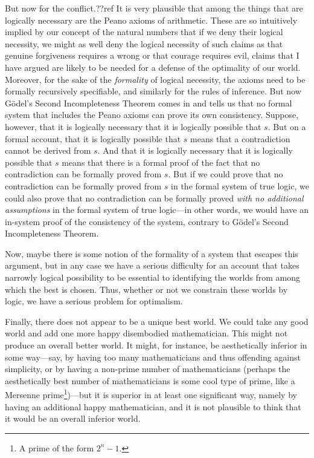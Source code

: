 But now for the conflict.??ref It is very plausible that among the things that are logically necessary are the Peano axioms of 
arithmetic. These are so intuitively implied by our concept of the natural numbers that if we deny their logical necessity,
we might as well deny the logical necessity of such claims as that genuine forgiveness requires a wrong or that courage 
requires evil, claims that I have argued are likely to be needed for a defense of the optimality of our world. Moreover, for
the sake of the \textit{formality} of logical necessity, the axioms need to be formally recursively specifiable, and similarly
for the rules of inference. But now G\"odel's Second Incompleteness Theorem comes in and tells us that no formal system 
that includes the Peano axioms can prove its own consistency. Suppose, however, that it is logically necessary that it is 
logically possible that $s$. But on a formal account, that it is logically possible that $s$ means that a contradiction
cannot be derived from $s$. And that it is logically necessary that it is logically possible that $s$ means that there is 
a formal proof of the fact that no contradiction can be formally proved from $s$. But if we could prove that no 
contradiction can be formally proved from $s$ in the formal system of true logic, we could also prove that no 
contradiction can be formally proved \textit{with no additional assumptions} in the formal system of true logic---in other words,
we would have an in-system proof of the consistency of the system, contrary to G\"odel's Second Incompleteness Theorem.

Now, maybe there is some notion of the formality of a system that escapes this argument, but in any case we have a 
serious difficulty for an account that takes narrowly logical possibility to be essential to identifying the worlds 
from among which the best is chosen. Thus, whether or not we constrain these worlds by logic, we have a serious problem
for optimalism.

Finally, there does not appear to be a unique best world. We could take any good world and add one more happy disembodied mathematician.
This might not produce an overall better world. It might, for instance, be aesthetically inferior in some way---say, by having too many
mathematicians and thus offending against simplicity, or by having a non-prime number of mathematicians (perhaps the aesthetically best 
number of mathematicians is some cool type of prime, like a Mersenne prime\footnote{A prime of the form $2^n-1$.})---but it is superior in at least one significant way, namely 
by having an additional happy mathematician, and it is not plausible to think that it would be an overall inferior world.

